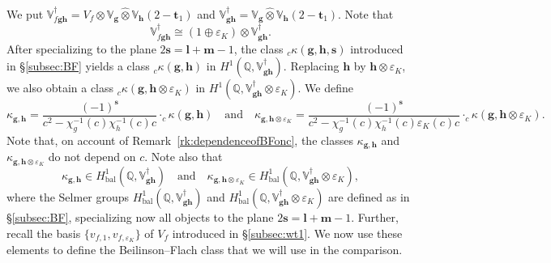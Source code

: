\documentclass[a4paper,11pt]{amsart}
\theoremstyle{plain}
\theoremstyle{definition}
\newtheorem{defi}[theorem]{Definition}
\theoremstyle{remark}
\newcommand{\bb}{\mathbb}
\DeclareMathOperator{\bal}{bal}
\newcommand{\hg}{{\mathbf{g}}}
\newcommand{\hh}{{\mathbf h}}
\numberwithin{equation}{section}
\begin{document}
We put $\bb{V}_{f\hg\hh}^\dagger=V_f\otimes\bb{V}_{\hg}\hat{\otimes} \bb{V}_\hh (2-\mathbf{t}_1)$ and $\bb{V}_{\hg\hh}^\dagger=\bb{V}_{\hg}\hat{\otimes}\bb{V}_\hh(2-\mathbf{t}_1)$. Note that
\[
\bb{V}_{f\hg\hh}^\dagger\cong(1\oplus \varepsilon_K)\otimes \bb{V}_{\hg\hh}^\dagger.
\]
After specializing to the plane $2\mathbf{s}=\mathbf{l}+\mathbf{m}-1$, the class $_c\kappa(\hg,\hh,\mathbf{s})$ introduced in \S\ref{subsec:BF} yields a class $_c\kappa(\hg,\hh)$ in $H^1(\bb{Q},\bb{V}_{\hg\hh}^\dagger)$. Replacing $\hh$ by $\hh\otimes\varepsilon_K$, we also obtain a class $_c\kappa(\hg,\hh\otimes\varepsilon_K)$ in $H^1(\bb{Q},\bb{V}_{\hg\hh}^\dagger\otimes\varepsilon_K)$. We define
\[
\kappa_{\hg,\hh}=\frac{(-1)^{\mathbf{s}}}{c^2-\chi_g^{-1}(c)\chi_h^{-1}(c)c} \cdot _c\kappa(\hg,\hh)\quad \text{and}\quad \kappa_{\hg,\hh\otimes\varepsilon_K}=\frac{(-1)^{\mathbf{s}}}{c^2-\chi_g^{-1}(c)\chi_h^{-1}(c)\varepsilon_K(c)c} \cdot _c\kappa(\hg,\hh\otimes\varepsilon_K).
\]
Note that, on account of Remark~\ref{rk:dependenceofBFonc}, the classes $\kappa_{\hg,\hh}$ and $\kappa_{\hg,\hh\otimes\varepsilon_K}$ do not depend on $c$. Note also that
\[
\kappa_{\hg,\hh}\in H^1_{\bal}(\bb{Q},\bb{V}_{\hg\hh}^\dagger) \quad \text{and}\quad \kappa_{\hg,\hh\otimes \varepsilon_K}\in H^1_{\bal}(\bb{Q},\bb{V}_{\hg\hh}^\dagger\otimes\varepsilon_K),
\]
where the Selmer groups $H^1_{\bal}(\bb{Q},\bb{V}_{\hg\hh}^\dagger)$ and $H^1_{\bal}(\bb{Q},\bb{V}_{\hg\hh}^\dagger\otimes\varepsilon_K)$ are defined as in \S\ref{subsec:BF}, specializing now all objects to the plane $2\mathbf{s}=\mathbf{l}+\mathbf{m}-1$.
Further, recall the basis $\{v_{f,1},v_{f,\varepsilon_K}\}$ of $V_f$ introduced in \S\ref{subsec:wt1}. We now use these elements to define the Beilinson--Flach class that we will use in the comparison. 



\end{document}
